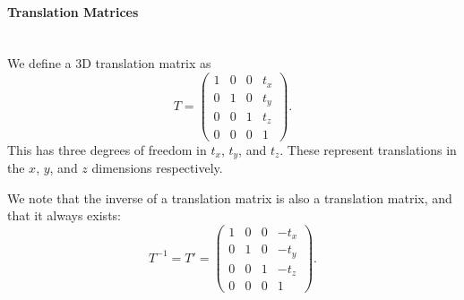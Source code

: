\documentclass{article}
\begin{document}
\paragraph{Translation Matrices}\mbox{}\\
We define a 3D translation matrix as
\begin{equation}
T = \begin{pmatrix}
1 & 0 & 0 & t_x\\
0 & 1 & 0 & t_y\\
0 & 0 & 1 & t_z\\
0 & 0 & 0 & 1
\end{pmatrix}.
\end{equation}
This has three degrees of freedom in $t_x$, $t_y$, and $t_z$. These represent translations in the $x$, $y$, and $z$ dimensions respectively.

We note that the inverse of a translation matrix is also a translation matrix, and that it always exists:
\begin{equation}
T^{-1} = T' = \begin{pmatrix}
1 & 0 & 0 & -t_x\\
0 & 1 & 0 & -t_y\\
0 & 0 & 1 & -t_z\\
0 & 0 & 0 & 1
\end{pmatrix}.
\end{equation}
\end{document}
